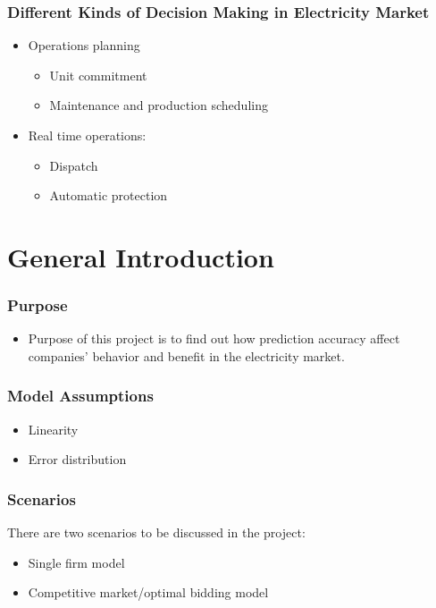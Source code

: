 \documentclass[compress,handout,10pt]{beamer}
\let\olditem\item
\renewcommand{\item}{\setlength{\itemsep}{0.5\baselineskip}\olditem}
\begin{document}
\begin{frame}
    \frametitle{Different Kinds of Decision Making in Electricity Market}
\begin{itemize}
                 \item Operations planning
              \begin{itemize}
                 \item Unit commitment
                 \item Maintenance and production scheduling
               \end{itemize}
                 \item Real time operations:
              \begin{itemize}
                 \item Dispatch
                 \item Automatic protection
               \end{itemize}
             \end{itemize}
\end{frame}

\section{General Introduction}
\begin{frame}
    \frametitle{Purpose}
     \begin{itemize}
     \item Purpose of this project is to find out how prediction accuracy affect companies' behavior and benefit in the electricity market.
     \end{itemize}
\end{frame}

\begin{frame}
    \frametitle{Model Assumptions}
     \begin{itemize}
     \item Linearity
     \item Error distribution
     \end{itemize}
\end{frame}

\begin{frame}
    \frametitle{Scenarios}
There are two scenarios to be discussed in the project:
     \begin{itemize}
     \item Single firm model
     \item Competitive market/optimal bidding model
     \end{itemize}
\end{frame}
\end{document}
